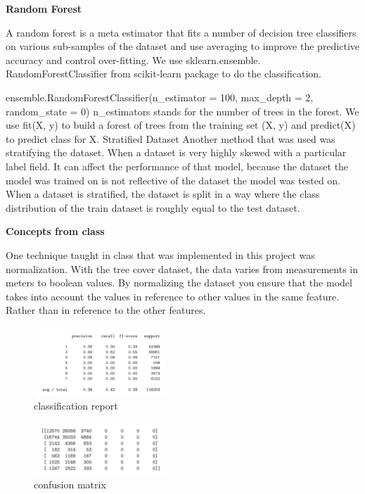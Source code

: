 \documentclass[conference]{IEEEtran}
\begin{document}
\noindent \textbf{Random Forest}

\noindent A random forest is a meta estimator that fits a number of decision tree classifiers on various sub-samples of the dataset and use averaging to improve the predictive accuracy and control over-fitting. We use sklearn.ensemble. RandomForestClassifier from scikit-learn package to do the classification. 

\noindent ensemble.RandomForestClassifier(n\_estimator = 100, max\_depth = 2, random\_state = 0)
n\_estimators stands for the number of trees in the forest.
We use fit(X, y) to build a forest of trees from the training set (X, y) and predict(X) to predict class for X.
Stratified Dataset
Another method that was used was stratifying the dataset. When a dataset is very highly skewed with a particular label field. It can affect the performance of that model, because the dataset the model was trained on is not reflective of the dataset the model was tested on. When a dataset is stratified, the dataset is split in a way where the class distribution of the train dataset is roughly equal to the test dataset. 

\noindent \textbf{Concepts from class}

\noindent One technique taught in class that was implemented in this project was normalization. With the tree cover dataset, the data varies from measurements in meters to boolean values. By normalizing the dataset you ensure that the model takes into account the values in reference to other values in the same feature. Rather 
than in reference to the other features.

\begin{figure}[htbp]
\centerline{\includegraphics[width=50mm,scale=0.5]{imgs/class_report}}
\caption{classification report}
\label{fig}
\end{figure}

\begin{figure}[htbp]
\centerline{\includegraphics[width=50mm,scale=0.5]{imgs/conf_matrix}}
\caption{confusion matrix}
\label{fig}
\end{figure}
\end{document}
